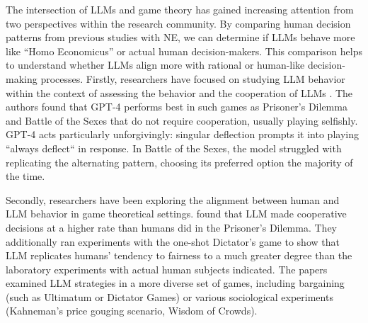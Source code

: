 \documentclass{article}
\begin{document}
The intersection of LLMs and game theory has gained increasing attention from two perspectives within the research community. 
By comparing human decision patterns from previous studies with NE, we can determine if LLMs behave more like ``Homo Economicus'' or actual human decision-makers. This comparison helps to understand whether LLMs align more with rational or human-like decision-making processes. Firstly, researchers have focused on studying LLM behavior within the context of assessing the behavior and the cooperation of LLMs \cite{akata2023playing,horton2023large,aher2023using}. %
The authors found that GPT-4 performs best in such games as Prisoner's Dilemma and Battle of the Sexes that do not require cooperation, usually playing selfishly. GPT-4 acts particularly unforgivingly: singular deflection prompts it into playing ``always deflect`` in response. In Battle of the Sexes, the model struggled with replicating the alternating pattern, choosing its preferred option the majority of the time. %

Secondly, researchers have been exploring the alignment between human and LLM behavior in game theoretical settings. \cite{brookins} %
found that LLM made cooperative decisions at a higher rate than humans did in the Prisoner's Dilemma. They additionally ran experiments with the one-shot Dictator's game to show that LLM replicates humans' tendency to fairness to a much greater degree than the laboratory experiments with actual human subjects indicated. The papers~\cite{horton2023large,aher2023using} examined LLM strategies in a more diverse set of games, including bargaining (such as Ultimatum or Dictator Games) or various sociological experiments (Kahneman's price gouging scenario, Wisdom of Crowds). %
\end{document}
